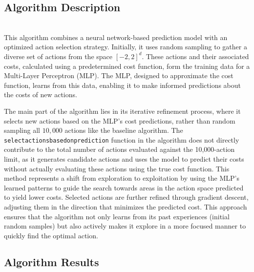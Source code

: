 \documentclass{article}
\begin{document}
\subsection*{Algorithm Description}
\hfill\\ 
This algorithm combines a neural network-based prediction model with an optimized action selection strategy.
Initially, it uses random sampling to gather a diverse set of actions from the space \([-2, 2]^d\). These actions and their associated costs, calculated using a predetermined cost function, form the training data for a Multi-Layer Perceptron (MLP). 
The MLP, designed to approximate the cost function, learns from this data, enabling it to make informed predictions about the costs of new actions.

The main part of the algorithm lies in its iterative refinement process, where it selects new actions based on the MLP's cost predictions, rather than random sampling all $10,000$ actions like the baseline algorithm.
The \texttt{select\textunderscore actions\textunderscore based\textunderscore on\textunderscore prediction} function in the algorithm does not directly contribute to the total number of actions evaluated against the 10,000-action limit, as it generates candidate actions and uses the model to predict their costs without actually evaluating these actions using the true cost function.
This method represents a shift from exploration to exploitation by using the MLP's learned patterns to guide the search towards areas in the action space predicted to yield lower costs. 
Selected actions are further refined through gradient descent, adjusting them in the direction that minimizes the predicted cost. 
This approach ensures that the algorithm not only learns from its past experiences (initial random samples) but also actively makes it explore in a more focused manner to quickly find the optimal action.
\subsection*{Algorithm Results}
\end{document}
